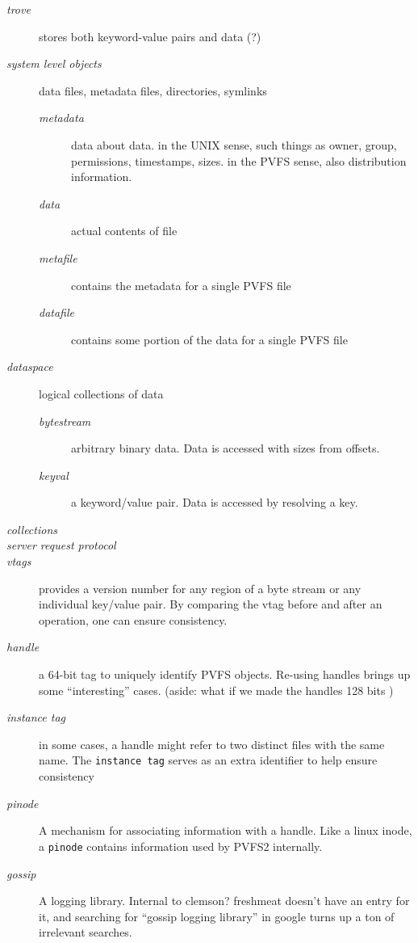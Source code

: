 \documentclass[10pt]{article} %
\begin{document}
\begin{description}
\item[\em trove ] stores both keyword-value pairs and data (?)

\item[\em system level objects ] data files, metadata files,
  directories, symlinks
  \begin{description}
    \item[\em metadata] data about data. in the UNIX sense, such things as
      owner, group, permissions, timestamps, sizes.  in the PVFS sense,
      also distribution information.
    \item[\em data] actual contents of file
    \item[\em metafile] contains the metadata for a single PVFS file
    \item[\em datafile] contains some portion of the data for a single PVFS
        file
  \end{description}
\item[\em dataspace] logical collections of data 
	\begin{description}
	\item[\em bytestream] arbitrary binary data.  Data is accessed
	with sizes from offsets.
	\item[\em keyval ] a keyword/value pair. Data is accessed by
	resolving a key.
	\end{description}
\item[\em collections ]
\item[\em server request protocol]
\item[\em vtags ] provides a version number for any region of a byte stream 
    or any individual key/value pair.  By comparing the vtag before and
    after an operation, one can ensure consistency.  
\item[\em handle] a 64-bit tag to uniquely identify PVFS objects.
  Re-using handles brings up some ``interesting'' cases.   (aside: what
  if we made the handles 128 bits )
\item[\em instance tag] in some cases, a handle might refer to two
  distinct files with the same name.  The {\tt instance tag} serves as
  an extra identifier to help ensure consistency
\item[\em pinode] A mechanism for associating information with a handle.  
  Like a linux inode, a {\tt pinode} contains information used by PVFS2
  internally.  

\item[\em gossip ] A logging library.  Internal to clemson?  freshmeat
doesn't have an entry for it, and searching for ``gossip logging
library'' in google turns up a ton of irrelevant searches.
\end{description}
\end{document}
